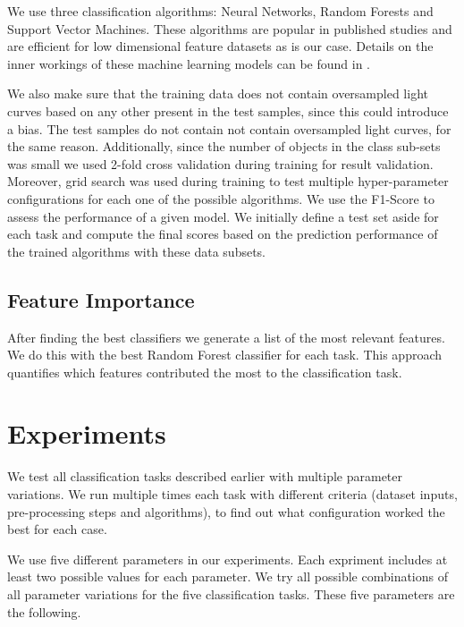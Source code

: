 \documentclass[a4paper,fleqn,usenatbib]{mnras}
\begin{document}
We use three classification algorithms: Neural Networks, Random
Forests and Support Vector Machines. 
These algorithms are popular in published studies and are efficient 
for low dimensional feature datasets as is our case. 
Details on the inner workings of these machine learning models can be
found in \cite{9780387848570}.  

We also make sure that the training data does not contain oversampled
light curves based on any other present in the test samples, since
this could introduce a bias.  
The test samples do not contain not contain oversampled light
curves, for the same reason. 
Additionally, since the number of objects in the class sub-sets was
small we used 2-fold cross validation during training for result
validation. 
Moreover, grid search was used during training to test multiple
hyper-parameter configurations for each one  of the possible
algorithms. 
We use the F1-Score to assess the performance of a given model.
We initially define a test set aside for each task and compute 
the final scores based on the prediction performance of the trained
algorithms with these data subsets.  


\subsection{Feature Importance} \label{subsection_importances}

After finding the best classifiers we generate  a list of the most
relevant features. 
We do this with  the best Random Forest classifier for each task. 
This approach quantifies  which features contributed the most to the
classification task.  

\section{Experiments} \label{section_experimentation}

We test all classification tasks described earlier with multiple
parameter variations.  
We run multiple times each task with different criteria 
(dataset inputs, pre-processing steps and algorithms), 
to find out  what configuration worked the best for each case. 

We use five different parameters in our experiments.
Each expriment includes at least two possible values for each
parameter.
We try all possible combinations of all parameter variations for the
five classification tasks. 
These five parameters are the following. 
\end{document}
